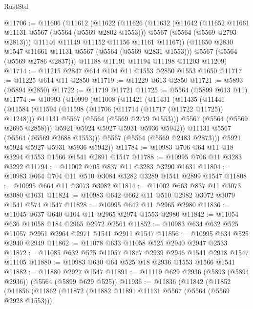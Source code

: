 \begin{lexlean}{RustStd}
\begin{coremodule}
@11706 := @11606
    (@11612
      (@11622
        (@11626
          (@11632
            (@11642
              (@11652 @11661 @11131 @5567 (@5564 (@5569 @2802 @1553)))
              @5567
              (@5564 (@5569 @2793 @2813)))
            @11146
            @11149
            @11152
            @11156
            @11161
            @11167))
        (@11650 @2830 @1547 @11661 @11131 @5567 (@5564 (@5569 @2831 @1553)))
        @5567
        (@5564 (@5569 @2786 @2837)))
      @11188
      @11191
      @11194
      @11198
      @11203
      @11209)
@11714 := @11215 @2847 @614 @104 @11 @1553 @2850 @1553 @1650
@11717 := @11225 @614 @11 @2850
@11719 := @11229 @613 @2850
@11721 := @5893 (@5894 @2850)
@11722 := @11719 @11721
@11725 := @5564 (@5899 @613 @11)
@11774 := @10993
    (@10999
      (@11008
        (@11421
          (@11431
            (@11435
              (@11441
                (@11584
                  (@11594
                    (@11598 (@11706 (@11714 (@11717 (@11722 @11725)) @11248)))
                    @11131
                    @5567
                    (@5564 (@5569 @2779 @1553)))
                  @5567
                  (@5564 (@5569 @2695 @2858)))
                @5921
                @5924
                @5927
                @5931
                @5936
                @5942))
            @11131
            @5567
            (@5564 (@5569 @2688 @1553)))
          @5567
          (@5564 (@5569 @2483 @2873)))
        @5921
        @5924
        @5927
        @5931
        @5936
        @5942))
@11784 := @10983 @706 @64 @11 @18 @3294 @1553 @1566 @1541 @2891 @1547
@11788 := @10995 @706 @11 @3283 @3292
@11794 := @11002 @705 @837 @11 @3283 @3290 @1631
@11804 := @10983 @664 @704 @11 @510 @3084 @3282 @3289 @1541 @2899 @1547
@11808 := @10995 @664 @11 @3073 @3082
@11814 := @11002 @663 @837 @11 @3073 @3080 @1631
@11824 := @10983 @642 @662 @11 @510 @2982 @3072 @3079 @1541 @574 @1547
@11828 := @10995 @642 @11 @2965 @2980
@11836 := @11045 @637 @640 @104 @11 @2965 @2974 @1553 @2980
@11842 := @11054 @636 @11058 @184 @2965 @2972 @2561
@11852 := @10983 @634 @632 @525 @11057 @2951 @2964 @2971 @1541 @2911 @1547
@11856 := @10995 @634 @525 @2940 @2949
@11862 := @11078 @633 @11058 @525 @2940 @2947 @2533
@11872 := @11085 @632 @525 @11057 @1877 @2939 @2946 @1541 @2918 @1547 @11105
@11880 := @10983 @630 @64 @525 @18 @2936 @1553 @1566 @1541
@11882 := @11880 @2927 @1547
@11891 := @11119 @629 @2936 (@5893 (@5894 @2936)) (@5564 (@5899 @629 @525))
@11936 := @11836
    (@11842
      (@11852
        (@11856
          (@11862
            (@11872
              (@11882 @11891 @11131 @5567 (@5564 (@5569 @2928 @1553)))

\end{coremodule}
\end{lexlean}
